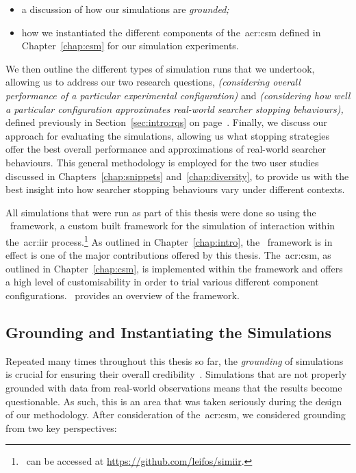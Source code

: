 \begin{itemize}
    \item{a discussion of how our simulations are \emph{grounded;}}
    \item{how we instantiated the different components of the~\gls{acr:csm} defined in Chapter~\ref{chap:csm} for our simulation experiments.}
\end{itemize}

We then outline the different types of simulation runs that we undertook, allowing us to address our two research questions,  \emph{(considering overall performance of a particular experimental configuration)} and  \emph{(considering how well a particular configuration approximates real-world searcher stopping behaviours),} defined previously in Section~\ref{sec:intro:rqs} on page~\pageref{sec:intro:rqs}. Finally, we discuss our approach for evaluating the simulations, allowing us what stopping strategies offer the best overall performance and approximations of real-world searcher behaviours. This general methodology is employed for the two user studies discussed in Chapters~\ref{chap:snippets} and~\ref{chap:diversity}, to provide us with the best insight into how searcher stopping behaviours vary under different contexts.

 All simulations that were run as part of this thesis were done so using the \simiir~framework, a custom built framework for the simulation of interaction within the~\gls{acr:iir} process.\footnote{\simiir~can be accessed at \url{https://github.com/leifos/simiir}. } As outlined in Chapter~\ref{chap:intro}, the \simiir~framework is in effect is one of the major contributions offered by this thesis. The~\gls{acr:csm}, as outlined in Chapter~\ref{chap:csm}, is implemented within the framework and offers a high level of customisability in order to trial various different component configurations.~\cite{maxwell2016simiir} provides an overview of the framework.

\subsection{Grounding and Instantiating the Simulations}\label{chap:csm:method:simulation:grounding}
Repeated many times throughout this thesis so far, the \emph{grounding} of simulations is crucial for ensuring their overall credibility~\citep{azzopardi2010workshop}. Simulations that are not properly grounded with data from real-world observations means that the results become questionable. As such, this is an area that was taken seriously during the design of our methodology. After consideration of the~\gls{acr:csm}, we considered grounding from two key perspectives:

